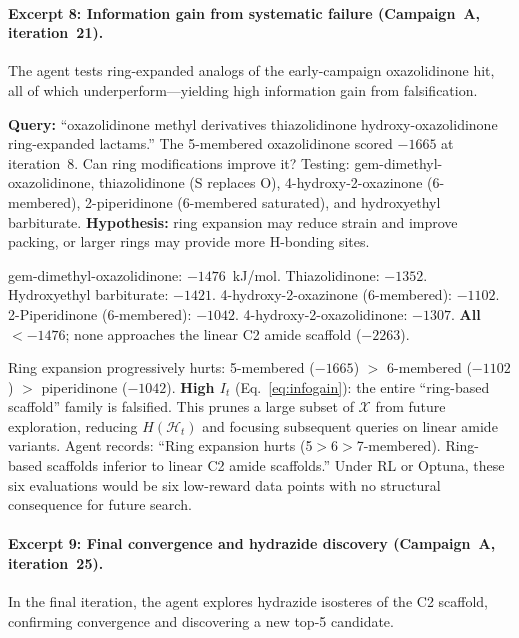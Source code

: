 \documentclass[twocolumn]{fairmeta}
\begin{document}
\paragraph{Excerpt 8: Information gain from systematic failure (Campaign~A, iteration~21).}
The agent tests ring-expanded analogs of the early-campaign oxazolidinone hit, all of which underperform---yielding high information gain from falsification.

\begin{agentthought}
\scriptsize
\textbf{Query:} ``oxazolidinone methyl derivatives thiazolidinone hydroxy-oxazolidinone ring-expanded lactams.''
The 5-membered oxazolidinone scored $-1665$ at iteration~8.
Can ring modifications improve it?
Testing: gem-dimethyl-oxazolidinone, thiazolidinone (S replaces O), 4-hydroxy-2-oxazinone (6-membered), 2-piperidinone (6-membered saturated), and hydroxyethyl barbiturate.
\textbf{Hypothesis:} ring expansion may reduce strain and improve packing, or larger rings may provide more H-bonding sites.
\end{agentthought}

\begin{toolcall}
\scriptsize
gem-dimethyl-oxazolidinone: $-1476$~kJ/mol. Thiazolidinone: $-1352$. Hydroxyethyl barbiturate: $-1421$.
4-hydroxy-2-oxazinone (6-membered): $-1102$. 2-Piperidinone (6-membered): $-1042$.
4-hydroxy-2-oxazolidinone: $-1307$.
\textbf{All} $< -1476$; none approaches the linear C2 amide scaffold ($-2263$).
\end{toolcall}

\begin{observation}
\scriptsize
Ring expansion progressively hurts: 5-membered ($-1665$) $>$ 6-membered ($-1102$) $>$ piperidinone ($-1042$).
\textbf{High $I_t$} (Eq.~\ref{eq:infogain}): the entire ``ring-based scaffold'' family is falsified.
This prunes a large subset of $\mathcal{X}$ from future exploration, reducing $H(\mathcal{H}_t)$ and focusing subsequent queries on linear amide variants.
Agent records: ``Ring expansion hurts (5$>$6$>$7-membered). Ring-based scaffolds inferior to linear C2 amide scaffolds.''
Under RL or Optuna, these six evaluations would be six low-reward data points with no structural consequence for future search.
\end{observation}

\paragraph{Excerpt 9: Final convergence and hydrazide discovery (Campaign~A, iteration~25).}
In the final iteration, the agent explores hydrazide isosteres of the C2 scaffold, confirming convergence and discovering a new top-5 candidate.
\end{document}

